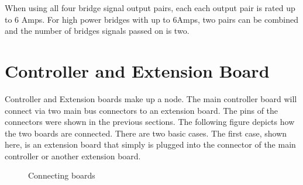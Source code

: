 When using all four bridge signal output pairs, each each output pair is rated up to 6 Amps. For high power bridges with up to 6Amps, two pairs can be combined and the number of bridges signals passed on is two.

\section{Controller and Extension Board}

Controller and Extension boards make up a node. The main controller board will connect via two main bus connectors to an extension board. The pins of the connectors were shown in the previous sections. The following figure depicts how the two boards are connected. There are two basic cases. The first case, shown here, is an extension board that simply is plugged into the connector of the main controller or another extension board.

\begin{figure}[htbp]
    \centering
    \caption{Connecting boards}
\end{figure}

